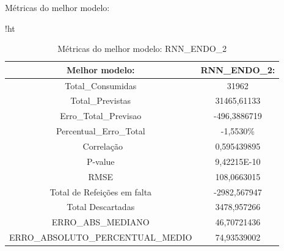 \documentclass[	12pt, Times, openright, twoside, a4paper, english, brazil]{abntex2}
\begin{document}
            Métricas do melhor modelo: 
           
           
            \begin{table}{!ht}
                \centering
                \caption{Métricas do melhor modelo:  RNN\_ENDO\_2 } 
                    \begin{tabular}{|c|c|}
                    \rowcolor{gray!50}
                    \hline
                    Melhor modelo: &   RNN\_ENDO\_2: \\ \hline
            Total\_Consumidas & 31962 \\ 
            Total\_Previstas & 31465,61133 \\
            Erro\_Total\_Previsao & -496,3886719 \\
            Percentual\_Erro\_Total & -1,5530\% \\\
            Correlação & 0,595439895 \\
            P-value & 9,42215E-10    \\
             RMSE &  108,0663015\\
            Total de Refeições em falta & -2982,567947 \\Total Descartadas & 3478,957266\\
            ERRO\_ABS\_MEDIANO & 46,70721436 \\ ERRO\_ABSOLUTO\_PERCENTUAL\_MEDIO & 74,93539002 \\ \hline \end{tabular} \end{table}
            
                        \begin{figure}[H]
            
            \end{figure}
\end{document}
